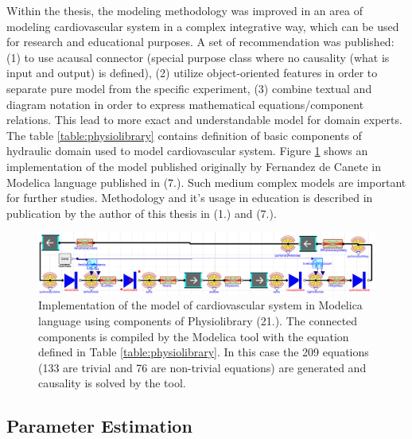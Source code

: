 Within the thesis, the modeling methodology was improved in an area of modeling cardiovascular system in a complex integrative way, which can be used for research and educational purposes. A set of recommendation was published: (1) to use acausal connector (special purpose class where no causality (what is input and output) is defined), (2) utilize object-oriented features in order to separate pure model from the specific experiment, (3) combine textual and diagram notation in order to express mathematical equations/component relations.
This lead to more exact and understandable model for domain experts. 
The table \ref{table:physiolibrary} contains definition of basic components of hydraulic domain used to model cardiovascular system. Figure \ref{fig:fernandezmodel} shows an  implementation of the model published originally by Fernandez de Canete \cite{FernandezDeCanete2013} in Modelica language published in (7.). Such medium complex models are important for further studies. Methodology and it's usage in education is described in publication by the author of this thesis in (1.) and (7.).


\begin{figure}[ht]
    \centering
    \includegraphics[width=1\textwidth]{fernandezmodel.png}
    \caption{Implementation of the model of cardiovascular system \cite{FernandezDeCanete2013} in Modelica language using components of Physiolibrary (21.). The connected components is compiled by the Modelica tool with the equation defined in Table \ref{table:physiolibrary}. In this case the 209 equations (133 are trivial and 76 are non-trivial equations) are generated and causality is solved by the tool.
    }
    \label{fig:fernandezmodel}
\end{figure}


\subsection{Parameter Estimation}

